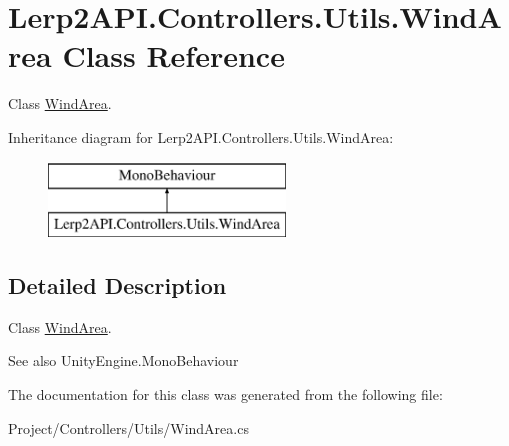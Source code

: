 \hypertarget{class_lerp2_a_p_i_1_1_controllers_1_1_utils_1_1_wind_area}{}\section{Lerp2\+A\+P\+I.\+Controllers.\+Utils.\+Wind\+Area Class Reference}
\label{class_lerp2_a_p_i_1_1_controllers_1_1_utils_1_1_wind_area}


Class \hyperlink{class_lerp2_a_p_i_1_1_controllers_1_1_utils_1_1_wind_area}{Wind\+Area}.  


Inheritance diagram for Lerp2\+A\+P\+I.\+Controllers.\+Utils.\+Wind\+Area\+:\begin{figure}[H]
\begin{center}
\leavevmode
\includegraphics[height=2.000000cm]{class_lerp2_a_p_i_1_1_controllers_1_1_utils_1_1_wind_area}
\end{center}
\end{figure}


\subsection{Detailed Description}
Class \hyperlink{class_lerp2_a_p_i_1_1_controllers_1_1_utils_1_1_wind_area}{Wind\+Area}. 

\begin{DoxySeeAlso}{See also}
Unity\+Engine.\+Mono\+Behaviour


\end{DoxySeeAlso}


The documentation for this class was generated from the following file\+:\begin{DoxyCompactItemize}
\item 
Project/\+Controllers/\+Utils/Wind\+Area.\+cs\end{DoxyCompactItemize}
